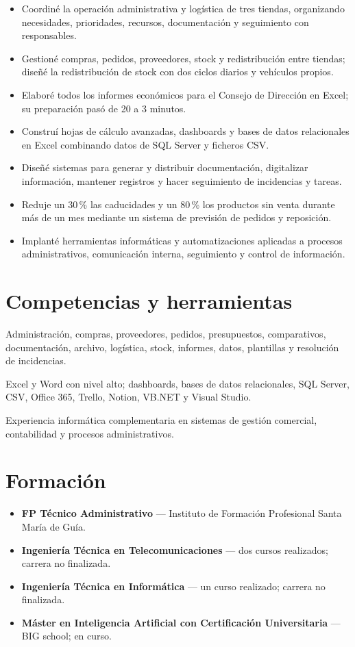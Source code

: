 \documentclass[11pt,a4paper]{article}
\newcommand{\entry}[2]{\textbf{#1} --- #2}
\begin{document}
\begin{itemize}
  \item Coordiné la operación administrativa y logística de tres tiendas, organizando necesidades, prioridades, recursos, documentación y seguimiento con responsables.
  \item Gestioné compras, pedidos, proveedores, stock y redistribución entre tiendas; diseñé la redistribución de stock con dos ciclos diarios y vehículos propios.
  \item Elaboré todos los informes económicos para el Consejo de Dirección en Excel; su preparación pasó de 20 a 3 minutos.
  \item Construí hojas de cálculo avanzadas, dashboards y bases de datos relacionales en Excel combinando datos de SQL Server y ficheros CSV.
  \item Diseñé sistemas para generar y distribuir documentación, digitalizar información, mantener registros y hacer seguimiento de incidencias y tareas.
  \item Reduje un 30\,\% las caducidades y un 80\,\% los productos sin venta durante más de un mes mediante un sistema de previsión de pedidos y reposición.
  \item Implanté herramientas informáticas y automatizaciones aplicadas a procesos administrativos, comunicación interna, seguimiento y control de información.
\end{itemize}

\section*{Competencias y herramientas}
Administración, compras, proveedores, pedidos, presupuestos, comparativos, documentación, archivo, logística, stock, informes, datos, plantillas y resolución de incidencias.

Excel y Word con nivel alto; dashboards, bases de datos relacionales, SQL Server, CSV, Office 365, Trello, Notion, VB.NET y Visual Studio.

Experiencia informática complementaria en sistemas de gestión comercial, contabilidad y procesos administrativos.

\section*{Formación}
\begin{itemize}
  \item \entry{FP Técnico Administrativo}{Instituto de Formación Profesional Santa María de Guía.}
  \item \entry{Ingeniería Técnica en Telecomunicaciones}{dos cursos realizados; carrera no finalizada.}
  \item \entry{Ingeniería Técnica en Informática}{un curso realizado; carrera no finalizada.}
  \item \entry{Máster en Inteligencia Artificial con Certificación Universitaria}{BIG school; en curso.}
\end{itemize}
\end{document}
